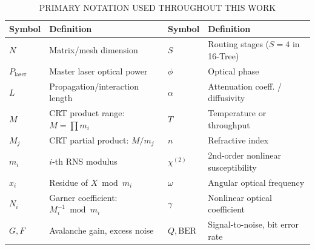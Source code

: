 \documentclass[journal]{IEEEtran}
\begin{document}
\begin{table}[htbp]
\centering
\caption{PRIMARY NOTATION USED THROUGHOUT THIS WORK}
\label{tab:table22}
\scriptsize
\setlength{\tabcolsep}{2pt}
\begin{tabular}{ll|ll}
\toprule
Symbol & Definition & Symbol & Definition \\
\midrule
$N$ & Matrix/mesh dimension & $S$ & Routing stages ($S=4$ in 16-Tree) \\
$P_{\text{laser}}$ & Master laser optical power & $\phi$ & Optical phase \\
$L$ & Propagation/interaction length & $\alpha$ & Attenuation coeff. / diffusivity \\
$M$ & CRT product range: $M = \prod m_i$ & $T$ & Temperature or throughput \\
$M_j$ & CRT partial product: $M/m_j$ & $n$ & Refractive index \\
$m_i$ & $i$-th RNS modulus & $\chi^{(2)}$ & 2nd-order nonlinear susceptibility \\
$x_i$ & Residue of $X \bmod m_i$ & $\omega$ & Angular optical frequency \\
$N_i$ & Garner coefficient: $M_i^{-1} \bmod m_i$ & $\gamma$ & Nonlinear optical coefficient \\
$G, F$ & Avalanche gain, excess noise & $Q, \mathrm{BER}$ & Signal-to-noise, bit error rate \\
\bottomrule
\end{tabular}
\end{table}

\providecommand{\BIBdecl}{\relax}
\renewcommand{\BIBdecl}{\scriptsize\setlength{\itemsep}{-0.5pt}}


\end{document}
